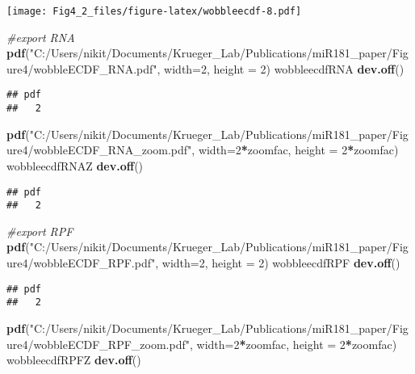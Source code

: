 \documentclass[
]{article}
\newenvironment{Shaded}{\begin{snugshade}}{\end{snugshade}}
\newcommand{\AttributeTok}[1]{\textcolor[rgb]{0.13,0.29,0.53}{#1}}
\newcommand{\CommentTok}[1]{\textcolor[rgb]{0.56,0.35,0.01}{\textit{#1}}}
\newcommand{\DecValTok}[1]{\textcolor[rgb]{0.00,0.00,0.81}{#1}}
\newcommand{\FunctionTok}[1]{\textcolor[rgb]{0.13,0.29,0.53}{\textbf{#1}}}
\newcommand{\NormalTok}[1]{#1}
\newcommand{\SpecialCharTok}[1]{\textcolor[rgb]{0.81,0.36,0.00}{\textbf{#1}}}
\newcommand{\StringTok}[1]{\textcolor[rgb]{0.31,0.60,0.02}{#1}}
\begin{document}
\texttt{[image: Fig4\_2\_files/figure-latex/wobbleecdf-8.pdf]}

\begin{Shaded}
\begin{Highlighting}[]
\CommentTok{\#export RNA}
\FunctionTok{pdf}\NormalTok{(}\StringTok{"C:/Users/nikit/Documents/Krueger\_Lab/Publications/miR181\_paper/Figure4/wobbleECDF\_RNA.pdf"}\NormalTok{, }\AttributeTok{width=}\DecValTok{2}\NormalTok{, }\AttributeTok{height =} \DecValTok{2}\NormalTok{)}
\NormalTok{wobbleecdfRNA}
\FunctionTok{dev.off}\NormalTok{()}
\end{Highlighting}
\end{Shaded}

\begin{verbatim}
## pdf 
##   2
\end{verbatim}

\begin{Shaded}
\begin{Highlighting}[]
\FunctionTok{pdf}\NormalTok{(}\StringTok{"C:/Users/nikit/Documents/Krueger\_Lab/Publications/miR181\_paper/Figure4/wobbleECDF\_RNA\_zoom.pdf"}\NormalTok{, }\AttributeTok{width=}\DecValTok{2}\SpecialCharTok{*}\NormalTok{zoomfac, }\AttributeTok{height =} \DecValTok{2}\SpecialCharTok{*}\NormalTok{zoomfac)}
\NormalTok{wobbleecdfRNAZ}
\FunctionTok{dev.off}\NormalTok{()}
\end{Highlighting}
\end{Shaded}

\begin{verbatim}
## pdf 
##   2
\end{verbatim}

\begin{Shaded}
\begin{Highlighting}[]
\CommentTok{\#export RPF}
\FunctionTok{pdf}\NormalTok{(}\StringTok{"C:/Users/nikit/Documents/Krueger\_Lab/Publications/miR181\_paper/Figure4/wobbleECDF\_RPF.pdf"}\NormalTok{, }\AttributeTok{width=}\DecValTok{2}\NormalTok{, }\AttributeTok{height =} \DecValTok{2}\NormalTok{)}
\NormalTok{wobbleecdfRPF}
\FunctionTok{dev.off}\NormalTok{()}
\end{Highlighting}
\end{Shaded}

\begin{verbatim}
## pdf 
##   2
\end{verbatim}

\begin{Shaded}
\begin{Highlighting}[]
\FunctionTok{pdf}\NormalTok{(}\StringTok{"C:/Users/nikit/Documents/Krueger\_Lab/Publications/miR181\_paper/Figure4/wobbleECDF\_RPF\_zoom.pdf"}\NormalTok{, }\AttributeTok{width=}\DecValTok{2}\SpecialCharTok{*}\NormalTok{zoomfac, }\AttributeTok{height =} \DecValTok{2}\SpecialCharTok{*}\NormalTok{zoomfac)}
\NormalTok{wobbleecdfRPFZ}
\FunctionTok{dev.off}\NormalTok{()}
\end{Highlighting}
\end{Shaded}
\end{document}
